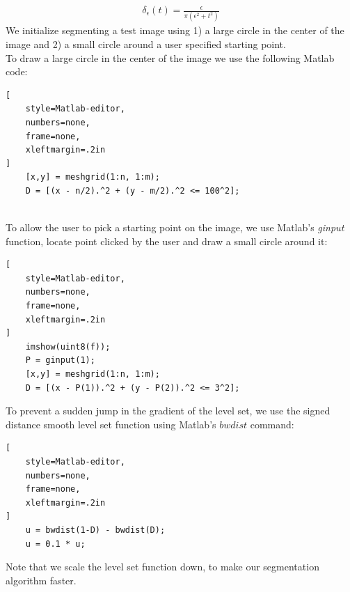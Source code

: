 \documentclass[a4paper,11pt]{article}
\begin{document}
\begin{align*}
\delta_{\epsilon}(t) = \frac{\epsilon}{\pi(\epsilon^2 + t^2)}
\end{align*}
We initialize segmenting a test image using 1) a large circle in the center of the image and 2) a small circle around a user specified starting point. \\
To draw a large circle in the center of the image we use the following Matlab code:
\begin{lstlisting}[
    style=Matlab-editor,
    numbers=none,
    frame=none,
    xleftmargin=.2in
]
    [x,y] = meshgrid(1:n, 1:m);
    D = [(x - n/2).^2 + (y - m/2).^2 <= 100^2];
\end{lstlisting}
 \\
To allow the user to pick a starting point on the image, we use Matlab's \emph{ginput} function, locate point clicked by the user and draw a small circle around it:
\begin{lstlisting}[
    style=Matlab-editor,
    numbers=none,
    frame=none,
    xleftmargin=.2in
]
    imshow(uint8(f));
    P = ginput(1);
    [x,y] = meshgrid(1:n, 1:m);
    D = [(x - P(1)).^2 + (y - P(2)).^2 <= 3^2];
\end{lstlisting}
To prevent a sudden jump in the gradient of the level set, we use the signed distance smooth level set function using Matlab's $bwdist$ command:
\begin{lstlisting}[
    style=Matlab-editor,
    numbers=none,
    frame=none,
    xleftmargin=.2in
]
    u = bwdist(1-D) - bwdist(D);
    u = 0.1 * u;
\end{lstlisting}
Note that we scale the level set function down, to make our segmentation algorithm faster.

\newpage
\end{document}
